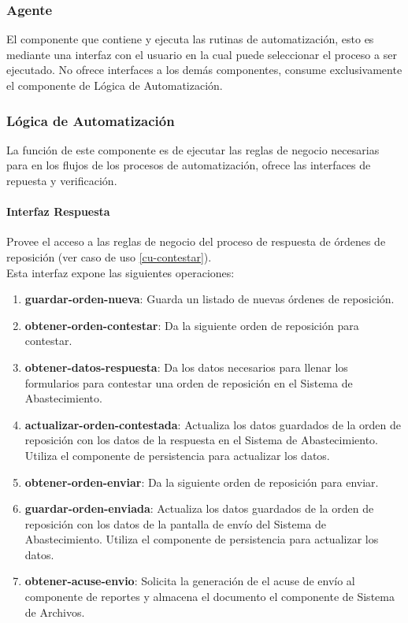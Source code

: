 \subsubsection{Agente}
El componente que contiene y ejecuta las rutinas de automatización, esto es mediante una interfaz con el usuario en la cual puede seleccionar el proceso a ser ejecutado. No ofrece interfaces a los demás componentes, consume exclusivamente el componente de Lógica de Automatización.

\subsubsection{Lógica de Automatización}
La función de este componente es de ejecutar las reglas de negocio necesarias para en los flujos de los procesos de automatización, ofrece las interfaces de repuesta y verificación.
\paragraph{Interfaz Respuesta\\}
Provee el acceso a las reglas de negocio del proceso de respuesta de órdenes de reposición (ver caso de uso \ref{cu-contestar}).\\
Esta interfaz expone las siguientes operaciones:
\begin{enumerate}
	\item \textbf{guardar-orden-nueva}: Guarda un listado de nuevas órdenes de reposición.
	\item \textbf{obtener-orden-contestar}: Da la siguiente orden de reposición para contestar.
	\item \textbf{obtener-datos-respuesta}: Da los datos necesarios para llenar los formularios para contestar una orden de reposición en el Sistema de Abastecimiento.
	\item \textbf{actualizar-orden-contestada}: Actualiza los datos guardados de la orden de reposición con los datos de la respuesta en el  Sistema de Abastecimiento. Utiliza el componente de persistencia para actualizar los datos.
	\item \textbf{obtener-orden-enviar}: Da la siguiente orden de reposición para enviar.
	\item \textbf{guardar-orden-enviada}: Actualiza los datos guardados de la orden de reposición con los datos de la pantalla de envío del Sistema de Abastecimiento. Utiliza el componente de persistencia para actualizar los datos.
	\item \textbf{obtener-acuse-envio}: Solicita la generación de el acuse de envío al componente de reportes y almacena el documento el componente de Sistema de Archivos.
\end{enumerate}

